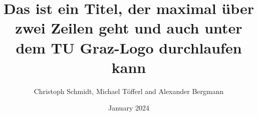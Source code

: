 \documentclass[final]{beamer}
\title{Das ist ein Titel, der maximal über zwei Zeilen geht und auch unter dem TU Graz-Logo durchlaufen kann}
\author{Christoph Schmidt, Michael Töfferl and Alexander Bergmann}
\institute{Institute of Electrical Measurement and Sensor Systems}
\date{January 2024}
\begin{document}
\begin{frame}[t]
    
    
\end{frame}
\end{document}
